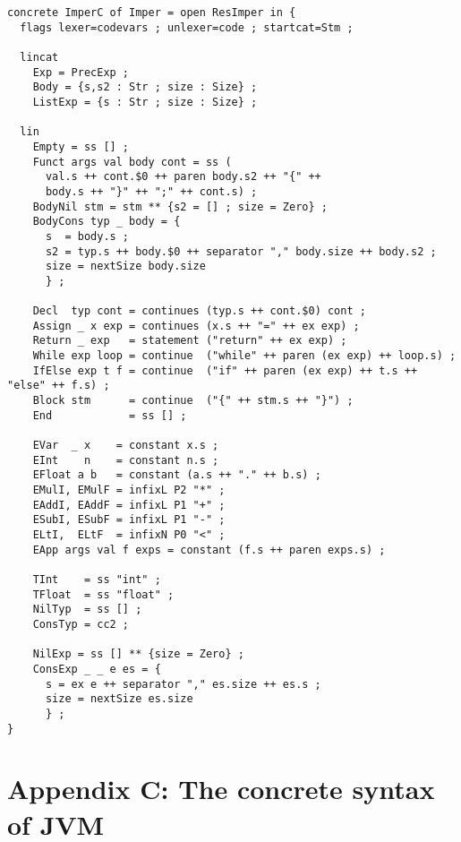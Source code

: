 \documentclass[12pt]{article}
\begin{document}
\small
\begin{verbatim}
concrete ImperC of Imper = open ResImper in {
  flags lexer=codevars ; unlexer=code ; startcat=Stm ;

  lincat
    Exp = PrecExp ;
    Body = {s,s2 : Str ; size : Size} ;
    ListExp = {s : Str ; size : Size} ;

  lin
    Empty = ss [] ;
    Funct args val body cont = ss (
      val.s ++ cont.$0 ++ paren body.s2 ++ "{" ++ 
      body.s ++ "}" ++ ";" ++ cont.s) ;
    BodyNil stm = stm ** {s2 = [] ; size = Zero} ;
    BodyCons typ _ body = {
      s  = body.s ; 
      s2 = typ.s ++ body.$0 ++ separator "," body.size ++ body.s2 ;
      size = nextSize body.size
      } ;

    Decl  typ cont = continues (typ.s ++ cont.$0) cont ;
    Assign _ x exp = continues (x.s ++ "=" ++ ex exp) ;
    Return _ exp   = statement ("return" ++ ex exp) ;
    While exp loop = continue  ("while" ++ paren (ex exp) ++ loop.s) ;
    IfElse exp t f = continue  ("if" ++ paren (ex exp) ++ t.s ++ "else" ++ f.s) ;
    Block stm      = continue  ("{" ++ stm.s ++ "}") ;
    End            = ss [] ;
 
    EVar  _ x    = constant x.s ;
    EInt    n    = constant n.s ;
    EFloat a b   = constant (a.s ++ "." ++ b.s) ;
    EMulI, EMulF = infixL P2 "*" ;
    EAddI, EAddF = infixL P1 "+" ;
    ESubI, ESubF = infixL P1 "-" ;
    ELtI,  ELtF  = infixN P0 "<" ;
    EApp args val f exps = constant (f.s ++ paren exps.s) ;

    TInt    = ss "int" ;
    TFloat  = ss "float" ;
    NilTyp  = ss [] ;
    ConsTyp = cc2 ;

    NilExp = ss [] ** {size = Zero} ;
    ConsExp _ _ e es = {
      s = ex e ++ separator "," es.size ++ es.s ;
      size = nextSize es.size
      } ;
}
\end{verbatim}
\normalsize
\newpage


\section*{Appendix C: The concrete syntax of JVM}
\end{document}
